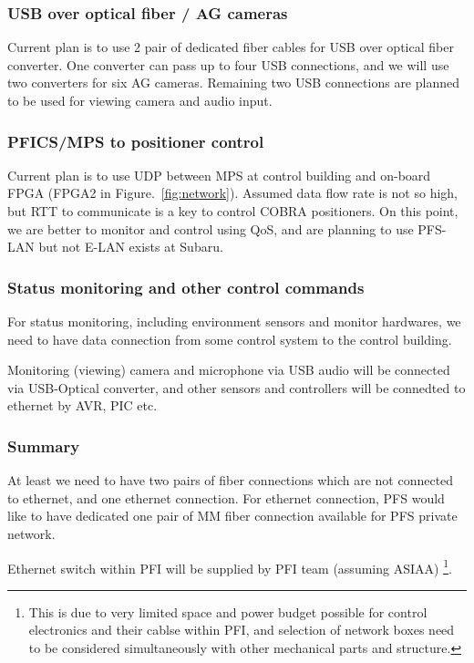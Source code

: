 \documentclass[a4paper,notitlepage]{article}
\begin{document}
\subsubsection{USB over optical fiber / AG cameras}

Current plan is to use 2 pair of dedicated fiber cables for USB over optical 
fiber converter. 
One converter can pass up to four USB connections, and we will use two 
converters for six AG cameras. 
Remaining two USB connections are planned to be used for viewing camera 
and audio input. 

\subsubsection{PFICS/MPS to positioner control}

Current plan is to use UDP between MPS at control building and on-board FPGA 
(FPGA2 in Figure.~\ref{fig:network}). 
Assumed data flow rate is not so high, but RTT to communicate is a key 
to control COBRA positioners. On this point, we are better to 
monitor and control using QoS, and are planning to use PFS-LAN but not E-LAN 
exists at Subaru. 

\subsubsection{Status monitoring and other control commands}

For status monitoring, including environment sensors and monitor hardwares, 
we need to have data connection from some control system to the control 
building. 

Monitoring (viewing) camera and microphone via USB audio will be 
connected via USB-Optical converter, and other sensors and controllers will be 
connedted to ethernet by AVR, PIC etc. 

\subsubsection{Summary}

At least we need to have two pairs of fiber connections which are not 
connected to ethernet, and one ethernet connection. 
For ethernet connection, PFS would like to have dedicated one pair of MM fiber 
connection available for PFS private network. 

Ethernet switch within PFI will be supplied by PFI team (assuming ASIAA)
\footnote{This is due to very limited space and power budget possible for 
control electronics and their cablse within PFI, and selection of network 
boxes need to be considered simultaneously with other mechanical parts and 
structure.}. 
\end{document}
